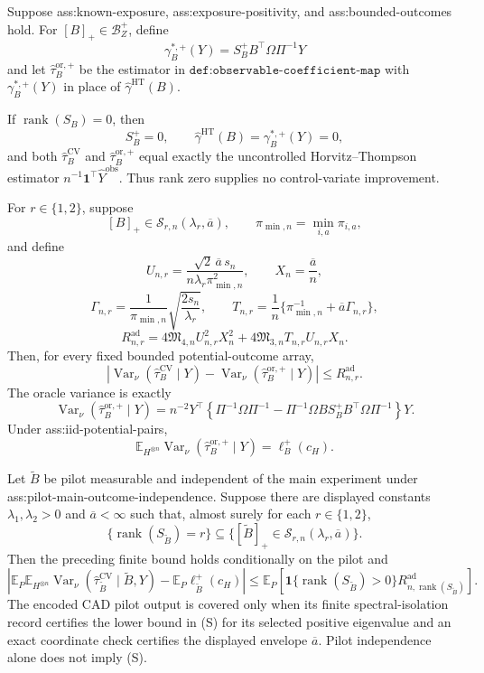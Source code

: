 Suppose ass:known-exposure, ass:exposure-positivity, and ass:bounded-outcomes hold.  For \([B]_+\in\mathcal B_Z^+\), define
\[
\gamma_B^{*,+}(Y)=S_B^+B^{\top}\Omega\Pi^{-1}Y
\]
and let \(\widehat\tau_B^{\mathrm{or},+}\) be the estimator in \(\texttt{def:observable-coefficient-map}\) with \(\gamma_B^{*,+}(Y)\) in place of \(\widehat\gamma^{\mathrm{HT}}(B)\).

If \(\operatorname{rank}(S_B)=0\), then
\[
S_B^+=0,
\qquad
\widehat\gamma^{\mathrm{HT}}(B)=\gamma_B^{*,+}(Y)=0,
\]
and both \(\widehat\tau_B^{\mathrm{CV}}\) and \(\widehat\tau_B^{\mathrm{or},+}\) equal exactly the uncontrolled Horvitz--Thompson estimator \(n^{-1}\mathbf1^{\top}\widehat Y^{\mathrm{obs}}\).  Thus rank zero supplies no control-variate improvement.

For \(r\in\{1,2\}\), suppose
\[
[B]_+\in\mathcal S_{r,n}(\lambda_r,\overline a),
\qquad
\pi_{\min,n}=\min_{i,a}\pi_{i,a},
\]
and define
\[
U_{n,r}=\frac{\sqrt2\,\overline a\,s_n}
{n\lambda_r\pi_{\min,n}^2},
\qquad X_n=\frac{\overline a}{n},
\]
\[
\Gamma_{n,r}=\frac1{\pi_{\min,n}}
\sqrt{\frac{2s_n}{\lambda_r}},
\qquad
T_{n,r}=\frac1n\{\pi_{\min,n}^{-1}
+\overline a\Gamma_{n,r}\},
\]
\[
R_{n,r}^{\mathrm{ad}}
=4\mathfrak M_{4,n}U_{n,r}^2X_n^2
+4\mathfrak M_{3,n}T_{n,r}U_{n,r}X_n.
\]
Then, for every fixed bounded potential-outcome array,
\[
\left|\operatorname{Var}_\nu(\widehat\tau_B^{\mathrm{CV}}\mid Y)
-\operatorname{Var}_\nu(\widehat\tau_B^{\mathrm{or},+}\mid Y)\right|
\le R_{n,r}^{\mathrm{ad}}.
\]
The oracle variance is exactly
\[
\operatorname{Var}_\nu(\widehat\tau_B^{\mathrm{or},+}\mid Y)
=n^{-2}Y^{\top}\left\{\Pi^{-1}\Omega\Pi^{-1}
-\Pi^{-1}\Omega B S_B^+B^{\top}\Omega\Pi^{-1}\right\}Y.
\]
Under ass:iid-potential-pairs,
\[
\mathbb E_{H^{\otimes n}}
\operatorname{Var}_\nu(\widehat\tau_B^{\mathrm{or},+}\mid Y)
=\ell_B^+(c_H).
\]

Let \(\widetilde B\) be pilot measurable and independent of the main experiment under ass:pilot-main-outcome-independence.  Suppose there are displayed constants \(\lambda_1,\lambda_2>0\) and \(\overline a<\infty\) such that, almost surely for each \(r\in\{1,2\}\),
\[
\{\operatorname{rank}(S_{\widetilde B})=r\}
\subseteq
\{[\widetilde B]_+\in\mathcal S_{r,n}(\lambda_r,\overline a)\}.
\tag{S}
\]
Then the preceding finite bound holds conditionally on the pilot and
\[
\left|\mathbb E_P\mathbb E_{H^{\otimes n}}
\operatorname{Var}_\nu(\widehat\tau_{\widetilde B}^{\mathrm{CV}}
\mid\widetilde B,Y)
-\mathbb E_P\ell_{\widetilde B}^+(c_H)\right|
\le\mathbb E_P\!\left[
\mathbf1\{\operatorname{rank}(S_{\widetilde B})>0\}
R_{n,\operatorname{rank}(S_{\widetilde B})}^{\mathrm{ad}}
\right].
\]
The encoded CAD pilot output is covered only when its finite spectral-isolation record certifies the lower bound in (S) for its selected positive eigenvalue and an exact coordinate check certifies the displayed envelope \(\overline a\).  Pilot independence alone does not imply (S).

